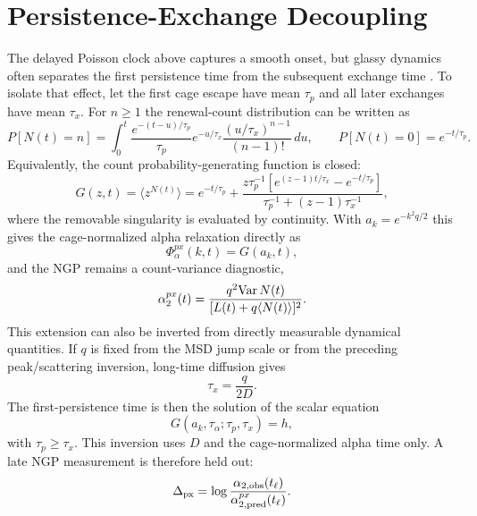 \documentclass[aps,preprint,onecolumn,superscriptaddress,nofootinbib]{revtex4-2}
\begin{document}
\section{Persistence-Exchange Decoupling}

The delayed Poisson clock above captures a smooth onset, but glassy dynamics
often separates the first persistence time from the subsequent exchange time
\cite{hedges2007persistence}.
To isolate that effect, let the first cage escape have mean $\tau_p$ and all
later exchanges have mean $\tau_x$. For $n\ge1$ the renewal-count distribution
can be written as
\begin{equation}
  P[N(t)=n]=
  \int_0^t \frac{e^{-(t-u)/\tau_p}}{\tau_p}
  e^{-u/\tau_x}\frac{(u/\tau_x)^{n-1}}{(n-1)!}\,du,
  \qquad
  P[N(t)=0]=e^{-t/\tau_p}.
\end{equation}
Equivalently, the count probability-generating function is closed:
\begin{equation}
  G(z,t)=\langle z^{N(t)}\rangle
  =e^{-t/\tau_p}
  +\frac{z\tau_p^{-1}\left[
    e^{(z-1)t/\tau_x}-e^{-t/\tau_p}
  \right]}
  {\tau_p^{-1}+(z-1)\tau_x^{-1}},
\end{equation}
where the removable singularity is evaluated by continuity. With
$a_k=e^{-k^2q/2}$ this gives the cage-normalized alpha relaxation directly as
\begin{equation}
  \Phi_\alpha^{px}(k,t)=G(a_k,t),
\end{equation}
and the NGP remains a count-variance diagnostic,
\begin{equation}
  \alpha_2^{px}(t)=
  \frac{q^2{\rm Var}\,N(t)}
       {[L(t)+q\langle N(t)\rangle]^2}.
\end{equation}
This extension can also be inverted from directly measurable dynamical
quantities. If $q$ is fixed from the MSD jump scale or from the preceding
peak/scattering inversion, long-time diffusion gives
\begin{equation}
  \tau_x=\frac{q}{2D}.
\end{equation}
The first-persistence time is then the solution of the scalar equation
\begin{equation}
  G(a_k,\tau_\alpha;\tau_p,\tau_x)=h,
\end{equation}
with $\tau_p\ge\tau_x$. This inversion uses $D$ and the cage-normalized
alpha time only. A late NGP measurement is therefore held out:
\begin{equation}
  \Delta_{\rm px}=
  \log\frac{\alpha_{2,\mathrm{obs}}(t_\ell)}
           {\alpha_{2,\mathrm{pred}}^{px}(t_\ell)}.
\end{equation}
\end{document}
